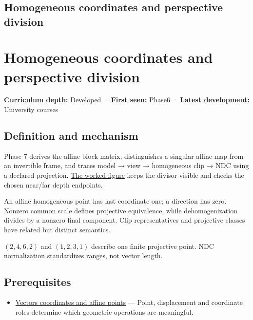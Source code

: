 \hypertarget{appendix-cb3b26862282}{}
\section*{Homogeneous coordinates and perspective division}
\chapter{Homogeneous coordinates and perspective division}\label{appendix-cb3b26862282-homogeneous-coordinates-and-perspective-division}

\textbf{Curriculum depth:} Developed · \textbf{First seen:} Phase6 · \textbf{Latest development:} University courses

\section{Definition and mechanism}\label{appendix-cb3b26862282-definition-and-mechanism}

Phase 7 derives the affine block matrix, distinguishes a singular affine map from an invertible frame, and traces model → view → homogeneous clip → NDC using a declared projection. \href{Continuous\%20Notes/Computing\%20Foundations\%20-\%20From\%20Bits\%20to\%20C++\%20and\%20Systems\%20APIs\#Figure\%20M6\%20-\%20Follow\%20one\%20point\%20through\%20named\%20spaces}{The worked figure} keeps the divisor visible and checks the chosen near/far depth endpoints.

An affine homogeneous point has last coordinate one; a direction has zero. Nonzero common scale defines projective equivalence, while dehomogenization divides by a nonzero final component. Clip representatives and projective classes have related but distinct semantics.

\((2,4,6,2)\) and \((1,2,3,1)\) describe one finite projective point. NDC normalization standardizes ranges, not vector length.

\section{Prerequisites}\label{appendix-cb3b26862282-prerequisites}

\begin{itemize}
\tightlist
\item
  \hyperref[appendix-0659864c0aa3]{Vectors coordinates and affine points} --- Point, displacement and coordinate roles determine which geometric operations are meaningful.
\end{itemize}

